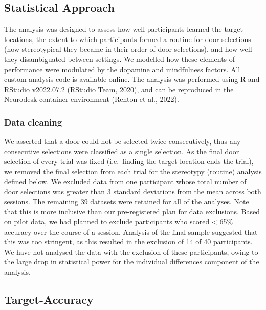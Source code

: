 \documentclass[
  man]{apa6}
\begin{document}
\hypertarget{statistical-approach}{%
\subsection{Statistical Approach}\label{statistical-approach}}

\label{sec:Statistical Approach}

The analysis was designed to assess how well participants learned the target locations, the extent to which participants formed a routine for door selections (how stereotypical they became in their order of door-selections), and how well they disambiguated between settings. We modelled how these elements of performance were modulated by the dopamine and mindfulness factors. All custom analysis code is available online. The analysis was performed using R and RStudio v2022.07.2 (RStudio Team, 2020), and can be reproduced in the Neurodesk container environment (Renton et al., 2022).

\hypertarget{data-cleaning}{%
\subsubsection{Data cleaning}\label{data-cleaning}}

\label{sec:Data cleaning}

We asserted that a door could not be selected twice consecutively, thus any consecutive selections were classified as a single selection. As the final door selection of every trial was fixed (i.e.~finding the target location ends the trial), we removed the final selection from each trial for the stereotypy (routine) analysis defined below. We excluded data from one participant whose total number of door selections was greater than 3 standard deviations from the mean across both sessions. The remaining 39 datasets were retained for all of the analyses. Note that this is more inclusive than our pre-registered plan for data exclusions. Based on pilot data, we had planned to exclude participants who scored \textless{} 65\% accuracy over the course of a session. Analysis of the final sample suggested that this was too stringent, as this resulted in the exclusion of 14 of 40 participants. We have not analysed the data with the exclusion of these participants, owing to the large drop in statistical power for the individual differences component of the analysis.

\hypertarget{target-accuracy}{%
\subsection{Target-Accuracy}\label{target-accuracy}}
\end{document}
